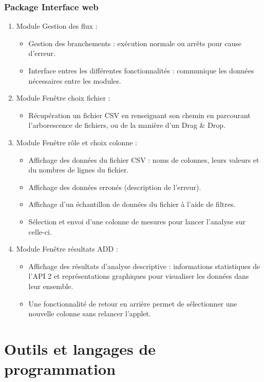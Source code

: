 			\subsubsection*{Package Interface web}
			\begin{enumerate}
				\item Module Gestion des flux :
					\begin{itemize}[leftmargin=*]
					\item Gestion des branchements : exécution normale ou arrêts pour cause d'erreur.
					\item Interface entres les différentes fonctionnalités : communique les données nécessaires entre les modules.
					\end{itemize}
				\item Module Fenêtre choix fichier :
					\begin{itemize}[leftmargin=*]
					\item Récupération un fichier CSV en renseignant son chemin en parcourant l'arborescence de fichiers, ou de la manière d'un Drag \& Drop.
					\end{itemize}
				\item Module Fenêtre rôle et choix colonne :
					\begin{itemize}[leftmargin=*]
					\item Affichage des données du fichier CSV : noms de colonnes, leurs valeurs et du nombres de lignes du fichier.
					\item Affichage des données erronés (description de l'erreur).
					\item Affichage d'un échantillon de données du fichier à l'aide de filtres.
					\item Sélection et envoi d'une colonne de mesures pour lancer l'analyse sur celle-ci. 
					\end{itemize}
				\item Module Fenêtre résultats ADD :
					\begin{itemize}[leftmargin=*]
					\item Affichage des résultats d'analyse descriptive : informations statistiques de l'API 2 et représentations graphiques pour visualiser les données dans leur ensemble.
					\item Une fonctionnalité de retour en arrière permet de sélectionner une nouvelle colonne sans relancer l'applet.
					\end{itemize}
				\end{enumerate}
		
	\section{Outils et langages de programmation}
